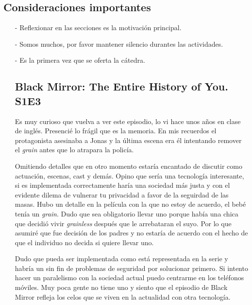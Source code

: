 \documentclass{article}
\theoremstyle{definition}
\begin{document}
\subsection{Consideraciones importantes}

\begin{itemize}

  \item[-] Reflexionar en las secciones es la motivación principal.
  \item[-] Somos muchos, por favor mantener silencio durantes las 
    actividades.
  \item[-] Es la primera vez que se oferta la cátedra.

\subsection{Black Mirror: The Entire History of You. S1E3}
\begin{flushleft}
Es muy curioso que vuelva a ver este episodio, lo vi hace unos años
en clase de inglés. Presencié lo frágil que es la memoria. En mis 
recuerdos el protagonista asesinaba a Jonas y la última escena era 
él intentando remover el \textit{grain} antes que lo atrapara la 
policía.

Omitiendo detalles que en otro momento estaría encantado de discutir
como actuación, escenas, cast y demás. Opino que sería una tecnología
interesante, si es implementada correctamente haría una sociedad más 
justa y con el evidente dilema de vulnerar tu privacidad a favor de 
la seguirdad de las masas. Hubo un detalle en la película con la que 
no estoy de acuerdo, el bebé tenía un \textit{grain}. Dudo que sea 
obligatorio llevar uno porque había una chica que decidió vivir
\textit{grainless} después que le arrebataran el suyo. Por lo que 
asumiré que fue decisión de los padres y no estaría de acuerdo con 
el hecho de que el individuo no decida si quiere llevar uno.

Dudo que pueda ser implementada como está representada 
en la serie y habría un sin fin de problemas de seguridad por 
solucionar primero. Si intento hacer un paralelismo con la sociedad 
actual puedo centrarme en los teléfonos móviles. Muy poca gente no 
tiene uno y siento que el episodio de Black Mirror refleja los 
celos que se viven en la actualidad con otra tecnología.
\end{flushleft}


\end{itemize}
\end{document}
